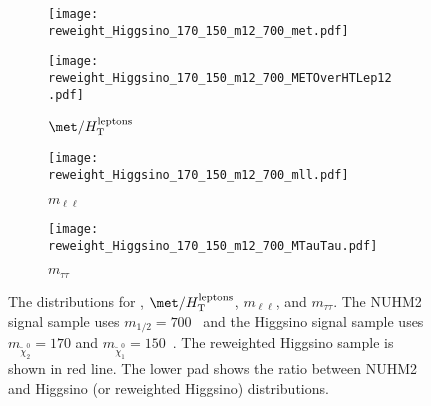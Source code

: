\begin{figure}[htbp]
    \begin{center}
        \begin{subfigure}[b]{0.48\textwidth}
            \texttt{[image: reweight\_Higgsino\_170\_150\_m12\_700\_met.pdf]}
            \caption{\met}
        \end{subfigure}
        \begin{subfigure}[b]{0.48\textwidth}
            \texttt{[image: reweight\_Higgsino\_170\_150\_m12\_700\_METOverHTLep12.pdf]}
            \caption{$\met/H^\mathrm{leptons}_\mathrm{T}$}
        \end{subfigure}
        \begin{subfigure}[b]{0.48\textwidth}
            \texttt{[image: reweight\_Higgsino\_170\_150\_m12\_700\_mll.pdf]}
            \caption{$m_{\ell \ell}$}
        \end{subfigure}
        \begin{subfigure}[b]{0.48\textwidth}
            \texttt{[image: reweight\_Higgsino\_170\_150\_m12\_700\_MTauTau.pdf]}
            \caption{$m_{\tau \tau}$}
        \end{subfigure}
    \end{center}
    \caption{The distributions for \met, $\met/H^\mathrm{leptons}_\mathrm{T}$, $m_{\ell \ell}$, and $m_{\tau \tau}$.
    The NUHM2 signal sample uses  $m_{1/2} = 700$~{\GeV} and the Higgsino signal sample uses $m_{\widetilde{\chi}^{0}_{2}} = 170$ and $m_{\widetilde{\chi}^{0}_{1}} = 150$~{\GeV}.
    The reweighted Higgsino sample is shown in red line.
    The lower pad shows the ratio between NUHM2 and Higgsino (or reweighted Higgsino) distributions.}
    \label{fig:results_nuhm2_reweighting_validation_3}
\end{figure}

